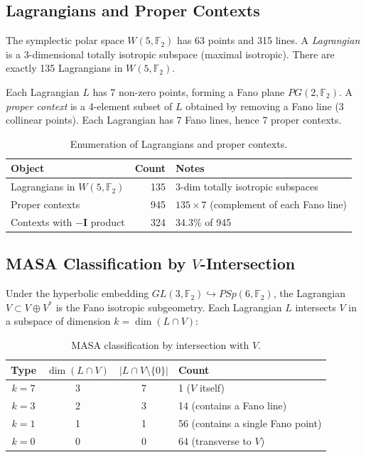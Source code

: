 \documentclass[11pt,a4paper]{article}
\theoremstyle{remark}
\newcommand{\F}{\mathbb{F}}
\begin{document}
\subsection{Lagrangians and Proper Contexts}

The symplectic polar space $W(5, \F_2)$ has 63 points and 315 lines.
A \emph{Lagrangian} is a 3-dimensional totally isotropic subspace
(maximal isotropic). There are exactly 135 Lagrangians in $W(5, \F_2)$.

Each Lagrangian $L$ has 7 non-zero points, forming a Fano plane
$PG(2, \F_2)$. A \emph{proper context} is a 4-element subset of $L$
obtained by removing a Fano line (3 collinear points). Each Lagrangian
has 7 Fano lines, hence 7 proper contexts.

\begin{table}[h]
\centering
\begin{tabular}{l r l}
\toprule
Object & Count & Notes \\
\midrule
Lagrangians in $W(5, \F_2)$ & 135 & 3-dim totally isotropic subspaces \\
Proper contexts & 945 & $135 \times 7$ (complement of each Fano line) \\
Contexts with $-\mathbf{I}$ product & 324 & 34.3\% of 945 \\
\bottomrule
\end{tabular}
\caption{Enumeration of Lagrangians and proper contexts.}
\label{tab:enumeration}
\end{table}

\subsection{\texorpdfstring{MASA Classification by $V$-Intersection}{MASA Classification by V-Intersection}}

Under the hyperbolic embedding $GL(3, \F_2) \hookrightarrow PSp(6, \F_2)$,
the Lagrangian $V \subset V \oplus V^*$ is the Fano isotropic
subgeometry. Each Lagrangian $L$ intersects $V$ in a subspace of
dimension $k = \dim(L \cap V)$:

\begin{table}[h]
\centering
\begin{tabular}{c c c l}
\toprule
Type & $\dim(L \cap V)$ & $|L \cap V \setminus \{0\}|$ & Count \\
\midrule
$k=7$ & 3 & 7 & 1 ($V$ itself) \\
$k=3$ & 2 & 3 & 14 (contains a Fano line) \\
$k=1$ & 1 & 1 & 56 (contains a single Fano point) \\
$k=0$ & 0 & 0 & 64 (transverse to $V$) \\
\bottomrule
\end{tabular}
\caption{MASA classification by intersection with $V$.}
\label{tab:masa-types}
\end{table}
\end{document}
